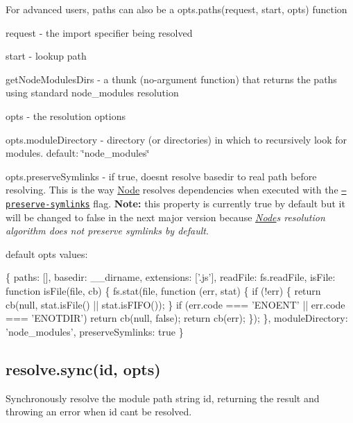 \begin{DoxyItemize}
For advanced users, {\ttfamily paths} can also be a {\ttfamily opts.\+paths(request, start, opts)} function
\begin{DoxyItemize}
\item request -\/ the import specifier being resolved
\item start -\/ lookup path
\item get\+Node\+Modules\+Dirs -\/ a thunk (no-\/argument function) that returns the paths using standard {\ttfamily node\+\_\+modules} resolution
\item opts -\/ the resolution options
\end{DoxyItemize}
\item opts.\+module\+Directory -\/ directory (or directories) in which to recursively look for modules. default\+: {\ttfamily \char`\"{}node\+\_\+modules\char`\"{}}
\item opts.\+preserve\+Symlinks -\/ if true, doesn\textquotesingle{}t resolve {\ttfamily basedir} to real path before resolving. This is the way \mbox{\hyperlink{classNode}{Node}} resolves dependencies when executed with the \href{https://nodejs.org/api/all.html#cli_preserve_symlinks}{\tt --preserve-\/symlinks} flag. {\bfseries Note\+:} this property is currently {\ttfamily true} by default but it will be changed to {\ttfamily false} in the next major version because {\itshape \mbox{\hyperlink{classNode}{Node}}\textquotesingle{}s resolution algorithm does not preserve symlinks by default}.
\end{DoxyItemize}

default {\ttfamily opts} values\+:


\begin{DoxyCode}
\{
    paths: [],
    basedir: \_\_dirname,
    extensions: ['.js'],
    readFile: fs.readFile,
    isFile: function isFile(file, cb) \{
        fs.stat(file, function (err, stat) \{
            if (!err) \{
                return cb(null, stat.isFile() || stat.isFIFO());
            \}
            if (err.code === 'ENOENT' || err.code === 'ENOTDIR') return cb(null, false);
            return cb(err);
        \});
    \},
    moduleDirectory: 'node\_modules',
    preserveSymlinks: true
\}
\end{DoxyCode}


\subsection*{resolve.\+sync(id, opts)}

Synchronously resolve the module path string {\ttfamily id}, returning the result and throwing an error when {\ttfamily id} can\textquotesingle{}t be resolved.

